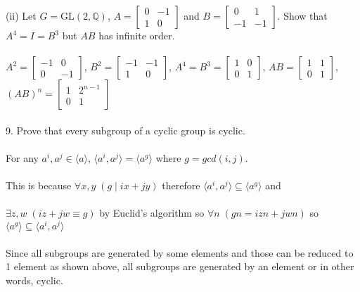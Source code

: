 \documentclass{article}
\begin{document}
\begin{siderules}
\color{blue}(ii) Let \(G=\text{GL}(2,\mathbb{Q})\), \(A=\begin{bmatrix}0&-1\\1&0\end{bmatrix}\) and 
\(B=\begin{bmatrix}0&1\\-1&-1\end{bmatrix}\). Show that \(A^{4}=I=B^{3}\) but \(AB\) has infinite order.\\\\\color{black}
\null\qquad \(A^{2}=\begin{bmatrix}-1&0\\0&-1\end{bmatrix}\), \(B^{2}=\begin{bmatrix}-1&-1\\1&0\end{bmatrix}\), 
\(A^{4}=B^{3}=\begin{bmatrix}1&0\\0&1\end{bmatrix}\), \(AB=\begin{bmatrix}1&1\\0&1\end{bmatrix}\), \((AB)^{n}=\begin{bmatrix}1&2^{n-1}\\0&1\end{bmatrix}\)\\\\
\color{blue}9. Prove that every subgroup of a cyclic group is cyclic.\\\\\color{black}
\null\qquad For any \(a^{i},a^{j}\in \langle a\rangle\), \(\langle a^{i},a^{j}\rangle=\langle a^{g}\rangle\) where \(g=gcd(i,j)\). \\\\
\null\qquad This is because \(\forall x,y\;(g\;|\;ix+jy)\) therefore \(\langle a^{i},a^{j}\rangle\subseteq\langle a^{g}\rangle\) and \\\\
\null\qquad \(\exists z,w\;(iz+jw\equiv g)\) by Euclid's algorithm so \(\forall n\;(gn=izn+jwn)\) so \(\langle a^{g}\rangle\subseteq\langle a^{i},a^{j}\rangle\)\\\\
\null\qquad Since all subgroups are generated by some elements and those can be reduced to 1 element as shown above, all subgroups are generated by an element or in other words, cyclic.\\\\

\end{siderules}
\end{document}
